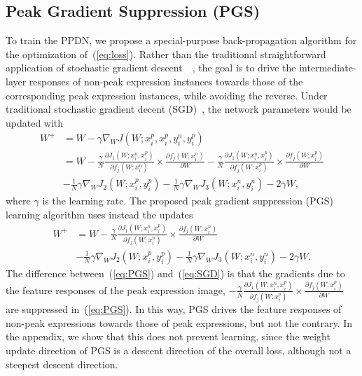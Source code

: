 \documentclass[runningheads]{llncs}
\begin{document}
\subsection{Peak Gradient Suppression (PGS)}

To train the PPDN, we propose a special-purpose back-propagation algorithm 
 for the optimization of~(\ref{eq:loss}). Rather than the traditional 
straightforward application of stochastic gradient 
descent~\cite{chopra2005learning}~\cite{schroff2015facenet}, the goal is to 
drive the intermediate-layer responses of non-peak expression instances 
towards those of the corresponding peak expression instances, while avoiding 
the reverse. Under traditional stochastic gradient decent 
(SGD)~\cite{bottou2010large}, the network parameters would be updated
with
\begin{equation}
\begin{split}
W^{+} &= W - \gamma \nabla_W J(W; x^p_{i},x^p_{i},y^n_{i},y^p_i)\\
  &= W -\frac{\gamma}{N}\frac{\partial J_{1}(W; x^n_{i},x^p_{i})}{\partial f_{j}(W;x^n_{i})}\times\frac{\partial f_{j}(W;x^n_{i})}{\partial W} - \frac{\gamma
}{N}\frac{\partial J_{1}(W; x^n_{i},x^p_{i})}{\partial f_{j}(W;x^p_{i})}\times\frac{\partial f_{j}(W;x^p_{i})}{\partial W} \\
 & - \frac{1}{N}\gamma \nabla_W J_{2}(W; x^p_{i},y^p_{i})
 - \frac{1}{N}\gamma \nabla_W J_{3}(W;x^n_{i},y^n_{i})
  - 2\gamma W,
\label{eq:SGD}
\end{split}
\end{equation}
where $\gamma$ is the learning rate. The proposed
peak gradient suppression (PGS) learning algorithm
uses instead the updates
 \begin{equation}
 \begin{split}
W^{+} 
  &= W -\frac{\gamma}{N}\frac{\partial J_{1}(W; x^n_{i},x^p_{i})}{\partial f_{j}(W;x^n_{i})}\times\frac{\partial f_{j}(W;x^n_{i})}{\partial W}  \\
 & - \frac{1}{N}\gamma \nabla_W J_{2}(W; x^p_{i},y^p_{i})
 - \frac{1}{N}\gamma \nabla_W J_{3}(W;x^n_{i},y^n_{i})
  - 2\gamma W.
 \label{eq:PGS}
 \end{split}
 \end{equation}
The difference between~(\ref{eq:PGS}) and~(\ref{eq:SGD}) is that the 
gradients due to the feature responses of the peak expression image, 
$-\frac{\gamma}{N}\frac{\partial J_{1}(W; x^n_{i},x^p_{i})}{\partial f_{j}(W;x^p_{i})}\times\frac{\partial f_{j}(W;x^p_{i})}{\partial W}$ are suppressed 
in~(\ref{eq:PGS}). In this way, PGS drives the feature responses of
non-peak expressions towards those of peak expressions, but not the
contrary. In the appendix, we show that this does not prevent learning,
since the weight update direction of PGS  is a descent direction of
the overall loss, although not a steepest descent direction.
\end{document}
